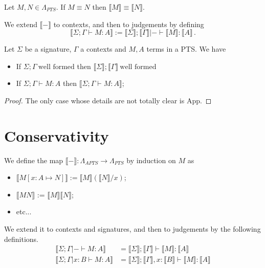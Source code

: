 \documentclass[]{StandardTemplate}
\begin{document}
\begin{cor}[]
Let $ M, N \in \Lambda_{PTS} $. If $ M \equiv N $ then $ \llbracket M \rrbracket \equiv \llbracket N \rrbracket $.
\end{cor}

We extend $ \llbracket - \rrbracket $ to contexts, and then to judgements by defining \[
\llbracket \Sigma; \Gamma \vdash M : A \rrbracket := \llbracket \Sigma \rrbracket; \llbracket \Gamma \rrbracket |- \vdash \llbracket M \rrbracket : \llbracket A \rrbracket
  \,.\]

\begin{thm}[Soundness]
  Let $ \Sigma $ be a signature, $ \Gamma $ a contexts and $ M, A $ terms in a PTS. We have
  \begin{itemize}
  \item If $ \Sigma; \Gamma~\text{well formed} $ then  $ \llbracket \Sigma  \rrbracket; \llbracket  \Gamma  \rrbracket~\text{well formed} $
  \item If $  \Sigma; \Gamma \vdash M : A  $ then $ \llbracket \Sigma; \Gamma \vdash M : A \rrbracket $;    
  \end{itemize}
\end{thm}
\begin{proof}
The only case whose details are not totally clear is App.
\end{proof}

\section{Conservativity}
\label{sec:cons}

We define the map $ \llbracket - \rrbracket : \Lambda_{APTS} \to \Lambda_{PTS} $ by induction on $ M $ as
\begin{itemize}
\item $ \llbracket M[x : A \mapsto N] \rrbracket := \llbracket M \rrbracket (\llbracket N \rrbracket /x) $;
\item $ \llbracket M N \rrbracket $ := $ \llbracket M \rrbracket \llbracket N \rrbracket $;
\item etc...
\end{itemize}

We extend it to contexts and signatures, and then to judgements by the following definitions.
\begin{align*}
\llbracket \Sigma; \Gamma |- \vdash M : A \rrbracket &= \llbracket \Sigma \rrbracket; \llbracket \Gamma \rrbracket \vdash \llbracket M \rrbracket : \llbracket A \rrbracket\\
\llbracket \Sigma; \Gamma |x : B \vdash M : A \rrbracket &= \llbracket \Sigma \rrbracket; \llbracket \Gamma \rrbracket, x : \llbracket B \rrbracket \vdash \llbracket M \rrbracket : \llbracket A \rrbracket
\end{align*}
\end{document}
